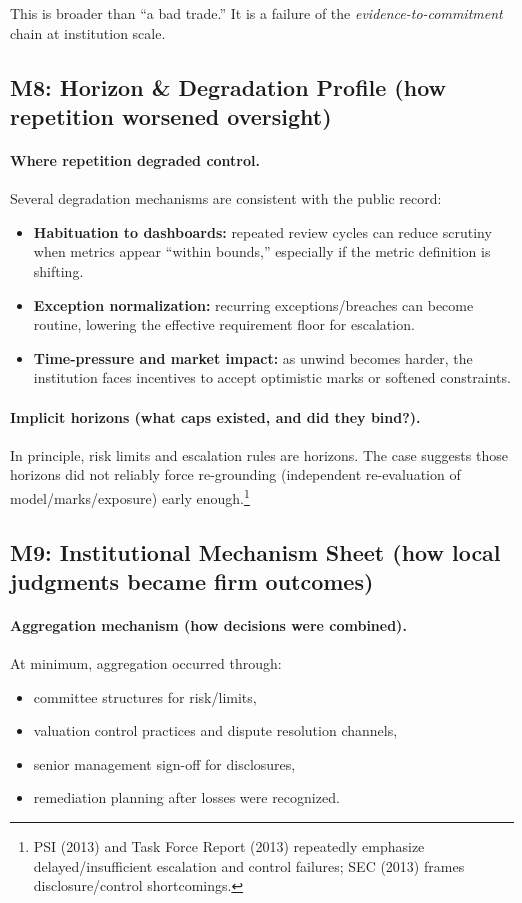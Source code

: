This is broader than “a bad trade.” It is a failure of the \emph{evidence-to-commitment} chain at institution scale.

\subsection{M8: Horizon \& Degradation Profile (how repetition worsened oversight)}
\label{subsec:lw-m8}

\paragraph{Where repetition degraded control.}
Several degradation mechanisms are consistent with the public record:
\begin{itemize}
\item \textbf{Habituation to dashboards:} repeated review cycles can reduce scrutiny when metrics appear “within bounds,” especially if the metric definition is shifting.
\item \textbf{Exception normalization:} recurring exceptions/breaches can become routine, lowering the effective requirement floor for escalation.
\item \textbf{Time-pressure and market impact:} as unwind becomes harder, the institution faces incentives to accept optimistic marks or softened constraints.
\end{itemize}

\paragraph{Implicit horizons (what caps existed, and did they bind?).}
In principle, risk limits and escalation rules are horizons. The case suggests those horizons did not reliably force re-grounding (independent re-evaluation of model/marks/exposure) early enough.\footnote{PSI (2013) and Task Force Report (2013) repeatedly emphasize delayed/insufficient escalation and control failures; SEC (2013) frames disclosure/control shortcomings.}

\subsection{M9: Institutional Mechanism Sheet (how local judgments became firm outcomes)}
\label{subsec:lw-m9}

\paragraph{Aggregation mechanism (how decisions were combined).}
At minimum, aggregation occurred through:
\begin{itemize}
\item committee structures for risk/limits,
\item valuation control practices and dispute resolution channels,
\item senior management sign-off for disclosures,
\item remediation planning after losses were recognized.
\end{itemize}


